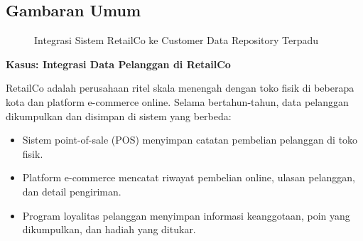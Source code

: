 \subsection{Gambaran Umum}

\begin{figure}[h]
	\centering
	\caption{Integrasi Sistem RetailCo ke Customer Data Repository Terpadu}
	\label{fig:retailco-integration}
\end{figure}





\textbf{Kasus: Integrasi Data Pelanggan di RetailCo}

RetailCo adalah perusahaan ritel skala menengah dengan toko fisik di beberapa kota dan platform e-commerce online. Selama bertahun-tahun, data pelanggan dikumpulkan dan disimpan di sistem yang berbeda:

\begin{itemize}
	\item Sistem point-of-sale (POS) menyimpan catatan pembelian pelanggan di toko fisik.
	\item Platform e-commerce mencatat riwayat pembelian online, ulasan pelanggan, dan detail pengiriman.
	\item Program loyalitas pelanggan menyimpan informasi keanggotaan, poin yang dikumpulkan, dan hadiah yang ditukar.
\end{itemize}

